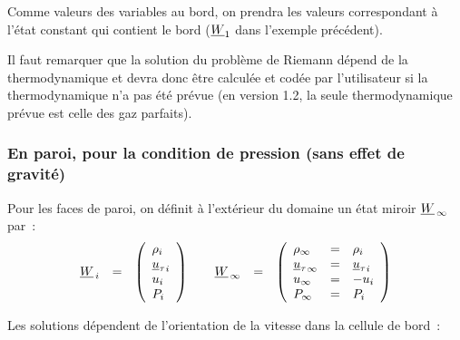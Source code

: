 Comme valeurs des variables au bord, on prendra les valeurs correspondant \`a
l'\'etat constant qui contient le bord ($\underline{W}_1$ dans l'exemple
pr\'ec\'edent).

Il faut remarquer que la solution du probl\`eme de Riemann d\'epend de la
thermodynamique et devra donc \^etre calcul\'ee et cod\'ee
par l'utilisateur si la thermodynamique n'a pas \'et\'e pr\'evue
(en version 1.2, la seule
thermodynamique pr\'evue est celle des gaz parfaits).



\subsubsection*{En paroi, pour la condition de pression (sans effet de gravit\'e)}

Pour les faces de paroi, on d\'efinit \`a l'ext\'erieur du domaine
un \'etat miroir $\underline{W}_{\,\infty}$ par~:
\begin{equation}\label{Cfbl_Cfxtcl_eq_paroi_cfxtcl}
\begin{array}{lllll}
\underline{W}_{\,i} &=&
\left(\begin{array}{l}
\rho_i\\ {\underline{u}_\tau}_i\\ u_i\\ P_i
\end{array}\right)
\qquad
\underline{W}_{\,\infty} &=&
\left(\begin{array}{lll}
\rho_\infty &=& \rho_i\\
{\underline{u}_\tau}_\infty &=& {\underline{u}_\tau}_i\\
u_\infty &=& -u_i\\
P_\infty &=& P_i
\end{array}\right)
\end{array}
\end{equation}

\vspace{0.5cm}

Les solutions d\'ependent de l'orientation de la vitesse dans la cellule
de bord~:

\vspace{0.5cm}

